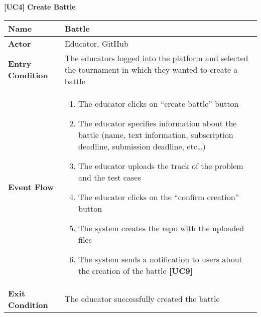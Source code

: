 \documentclass{article}
\begin{document}
\begin{table}
 \renewcommand{\arraystretch}{1.5}
    \centering
    \raggedright\textbf{[UC4] Create Battle}
    \begin{tabular}{|l|p{10cm}|}
        \hline
        \textbf{Name} & Battle\\
        \hline
        \textbf{Actor} & Educator, GitHub \\
        \hline
        \textbf{Entry Condition} & The educators logged into the platform and selected the tournament in which they wanted to create a battle \\
        \hline
        \textbf{Event Flow} & 
        \begin{enumerate}[align=left, topsep=0pt, partopsep=0pt]
            \item The educator clicks on “create battle” button
            \item The educator specifies information about the battle (name, text information, subscription deadline, submission deadline, etc…)
            \item The educator uploads the track of the problem and the test cases 
            \item The educator clicks on the “confirm creation” button
            \item The system creates the repo with the uploaded files
            \item The system sends a notification to users about the creation of the battle \textbf{[UC9]}
        \end{enumerate} \\
        \hline
        \textbf{Exit Condition} & The educator successfully created the battle  \\
        \hline
    \end{tabular}
\end{table}
\end{document}
